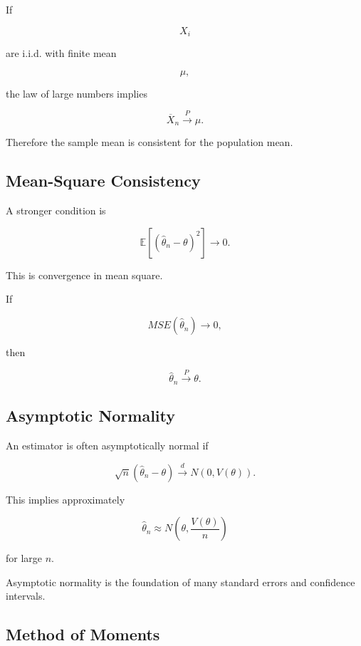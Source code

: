 If

\[
X_i
\]

are i.i.d. with finite mean

\[
\mu,
\]

the law of large numbers implies

\[
\boxed{
\overline{X}_n
\xrightarrow{P}
\mu.
}
\]

Therefore the sample mean is consistent for the population mean.

\subsection{Mean-Square Consistency}
\label{subsec:mean-square-consistency}

A stronger condition is

\[
\boxed{
\mathbb{E}
[
(
\widehat{\theta}_n-\theta
)^2
]
\to0.
}
\]

This is convergence in mean square.

If

\[
MSE(\widehat{\theta}_n)\to0,
\]

then

\[
\widehat{\theta}_n
\xrightarrow{P}
\theta.
\]

\subsection{Asymptotic Normality}
\label{subsec:asymptotic-normality-estimators}

An estimator is often asymptotically normal if

\[
\boxed{
\sqrt{n}
(
\widehat{\theta}_n-\theta
)
\xrightarrow{d}
N(0,V(\theta)).
}
\]

This implies approximately

\[
\boxed{
\widehat{\theta}_n
\approx
N
\left(
\theta,
\frac{
V(\theta)
}{n}
\right)
}
\]

for large \(n\).

Asymptotic normality is the foundation of many standard errors and
confidence intervals.

\subsection{Method of Moments}
\label{subsec:method-of-moments}

